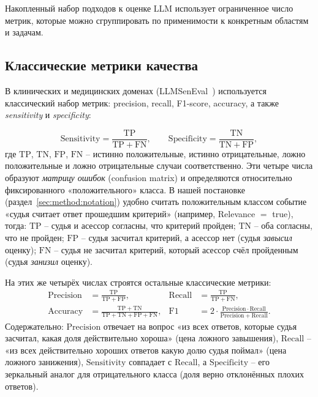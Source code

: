 Накопленный набор подходов к оценке LLM использует ограниченное число
метрик, которые можно сгруппировать по применимости к конкретным
областям и задачам.

\subsection{Классические метрики качества}

В клинических и медицинских доменах
(LLMSenEval~\cite{yan2025llmsemeval}) используется классический набор
метрик: precision, recall, F1-score, accuracy, а также
\emph{sensitivity} и \emph{specificity}:

\begin{equation}
    \label{eq:sensitivity}
    \mathrm{Sensitivity} =
        \frac{\mathrm{TP}}{\mathrm{TP} + \mathrm{FN}},
    \qquad
    \mathrm{Specificity} =
        \frac{\mathrm{TN}}{\mathrm{TN} + \mathrm{FP}},
\end{equation}
где $\mathrm{TP}$, $\mathrm{TN}$, $\mathrm{FP}$, $\mathrm{FN}$ --
истинно положительные, истинно отрицательные, ложно положительные и
ложно отрицательные случаи соответственно.
Эти четыре числа образуют \emph{матрицу ошибок} (confusion matrix) и
определяются относительно фиксированного «положительного» класса.
В нашей постановке (раздел~\ref{sec:method:notation}) удобно считать
положительным классом событие «судья считает ответ прошедшим
критерий» (например, Relevance $=$ true), тогда:
$\mathrm{TP}$ -- судья и асессор согласны, что критерий пройден;
$\mathrm{TN}$ -- оба согласны, что не пройден;
$\mathrm{FP}$ -- судья засчитал критерий, а асессор нет (судья
\emph{завысил} оценку); $\mathrm{FN}$ -- судья не засчитал критерий,
который асессор счёл пройденным (судья \emph{занизил} оценку).

На этих же четырёх числах строятся остальные классические метрики:
\begin{align}
    \label{eq:precision-recall}
    \mathrm{Precision} &= \frac{\mathrm{TP}}{\mathrm{TP} + \mathrm{FP}},
    &
    \mathrm{Recall} &= \frac{\mathrm{TP}}{\mathrm{TP} + \mathrm{FN}}, \\
    \label{eq:accuracy}
    \mathrm{Accuracy} &= \frac{\mathrm{TP} + \mathrm{TN}}
        {\mathrm{TP} + \mathrm{TN} + \mathrm{FP} + \mathrm{FN}},
    &
    \mathrm{F1} &= 2\cdot\frac{\mathrm{Precision}\cdot\mathrm{Recall}}
        {\mathrm{Precision} + \mathrm{Recall}}.
\end{align}
Содержательно: $\mathrm{Precision}$ отвечает на вопрос «из всех
ответов, которые судья засчитал, какая доля действительно хороша» (цена
ложного завышения), $\mathrm{Recall}$ -- «из всех действительно
хороших ответов какую долю судья поймал» (цена ложного занижения),
$\mathrm{Sensitivity}$ совпадает с $\mathrm{Recall}$, а
$\mathrm{Specificity}$ -- его зеркальный аналог для отрицательного
класса (доля верно отклонённых плохих ответов).

